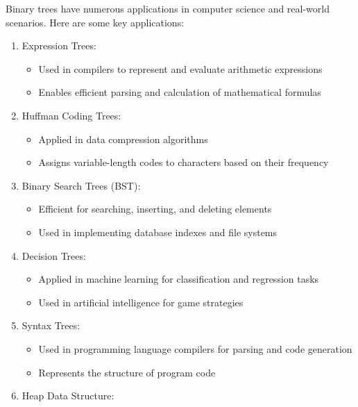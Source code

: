 Binary trees have numerous applications in computer science and
real-world scenarios. Here are some key applications:

\begin{enumerate}
\def\labelenumi{\arabic{enumi}.}
\tightlist
\item
  Expression Trees:

  \begin{itemize}
  \tightlist
  \item
    Used in compilers to represent and evaluate arithmetic expressions
  \item
    Enables efficient parsing and calculation of mathematical formulas
  \end{itemize}
\item
  Huffman Coding Trees:

  \begin{itemize}
  \tightlist
  \item
    Applied in data compression algorithms
  \item
    Assigns variable-length codes to characters based on their frequency
  \end{itemize}
\item
  Binary Search Trees (BST):

  \begin{itemize}
  \tightlist
  \item
    Efficient for searching, inserting, and deleting elements
  \item
    Used in implementing database indexes and file systems
  \end{itemize}
\item
  Decision Trees:

  \begin{itemize}
  \tightlist
  \item
    Applied in machine learning for classification and regression tasks
  \item
    Used in artificial intelligence for game strategies
  \end{itemize}
\item
  Syntax Trees:

  \begin{itemize}
  \tightlist
  \item
    Used in programming language compilers for parsing and code
    generation
  \item
    Represents the structure of program code
  \end{itemize}
\item
  Heap Data Structure:


\end{enumerate}

